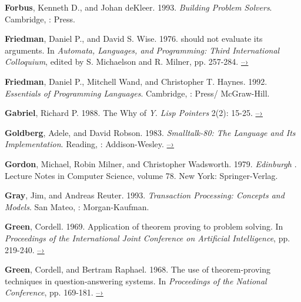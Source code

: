 { \label{Forbus and deKleer 1993}
\textbf{Forbus}, Kenneth D., and Johan deKleer.  1993.
\textit{Building Problem
Solvers}. Cambridge, :  Press.

 \label{Friedman and Wise (1976)}
\textbf{Friedman}, Daniel P., and David S. Wise.  1976.
 should not
evaluate its arguments. In \textit{Automata, Languages, and Programming: Third
International Colloquium}, edited by S. Michaelson and R.  Milner,
pp. 257-284.
\href{https://www.cs.indiana.edu/cgi-bin/techreports/TRNNN.cgi?trnum=TR44}{–›}

 \label{Friedman et al. 1992}
\textbf{Friedman}, Daniel P., Mitchell Wand, and Christopher T. Haynes. 1992.
\textit{Essentials of Programming Languages}.  Cambridge,
: 
Press/ McGraw-Hill.

 \label{Gabriel 1988}
\textbf{Gabriel}, Richard P. 1988.  The Why of \emph{Y}.
\textit{Lisp Pointers}
2(2): 15-25.
\href{http://www.dreamsongs.com/Files/WhyOfY.pdf}{–›}

\textbf{Goldberg}, Adele, and David Robson.  1983.
\textit{Smalltalk-80: The Language and
Its Implementation}. Reading, : Addison-Wesley.
\href{http://stephane.ducasse.free.fr/FreeBooks/BlueBook/Bluebook.pdf}{–›}

 \label{Gordon et al. 1979}
\textbf{Gordon}, Michael, Robin Milner, and Christopher Wadsworth.  1979.
\textit{Edinburgh }. Lecture Notes in Computer
Science, volume 78. New York:
Springer-Verlag.

 \label{Gray and Reuter 1993}
\textbf{Gray}, Jim, and Andreas Reuter. 1993. \textit{Transaction
  Processing: Concepts and
Models}. San Mateo, : Morgan-Kaufman.

 \label{Green 1969}
\textbf{Green}, Cordell.  1969.  Application of theorem proving to
problem solving.  In
\textit{Proceedings of the International Joint Conference on Artificial
Intelligence}, pp. 219-240.
\href{http://citeseer.ist.psu.edu/viewdoc/summary?doi=10.1.1.81.9820}{–›}

 \label{Green and Raphael (1968)}
\textbf{Green}, Cordell, and Bertram Raphael.  1968.  The use of
theorem-proving
techniques in question-answering systems.  In \textit{Proceedings of the
 National Conference}, pp. 169-181.
\href{http://www.kestrel.edu/home/people/green/publications/green-raphael.pdf}{–›}

}
